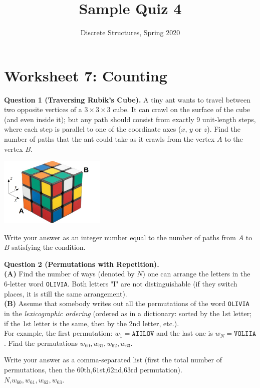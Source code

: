 \documentclass[jou]{apa6}
\title{Sample Quiz 4}
\author{Discrete Structures, Spring 2020}
\affiliation{RBS}
\begin{document}

\twocolumn
\section{Worksheet 7: Counting}

\vspace{10pt}
{\bf Question 1 (Traversing Rubik's Cube).} A tiny ant wants to travel 
between two opposite vertices of a $3 \times 3 \times 3$ cube. It can crawl
on the surface of the cube (and even inside it); but any path should consist from exactly $9$ unit-length
steps, where each step is parallel to one of the coordinate axes ($x$, $y$ or $z$). 
Find the number of paths that the ant could take as it crawls from the vertex $A$ to the vertex $B$. 
\begin{center}
\includegraphics[width=2in]{rubiks-cube.png}
\end{center}

Write your answer as an integer number equal to the number of paths from $A$ to $B$ satisfying the condition.






\vspace{6pt}
{\bf Question 2 (Permutations with Repetition).}\\
{\bf (A)} Find the number of ways (denoted by $N$) one can arrange the letters in the 6-letter word {\tt OLIVIA}. 
Both letters "I" are not distinguishable (if they switch places, it is still the same arrangement).\\
{\bf (B)} Assume that somebody writes out all the permutations of the word {\tt OLIVIA} 
in the {\em lexicographic ordering} (ordered as in a dictionary: sorted by the 1st letter; 
if the 1st letter is the same, then by the 2nd letter, etc.).\\
For example, the first permutation: $w_1 = \mathtt{AIILOV}$ and the last one is $w_N = \mathtt{VOLIIA}$. 
Find the permutations $w_{60},w_{61},w_{62},w_{63}$. 

Write your answer as a comma-separated list (first the total number of permutations, then the
$60$th,$61$st,$62$nd,$63$rd permutation).\\
$N$,$w_{60},w_{61},w_{62},w_{63}$. 
\end{document}
